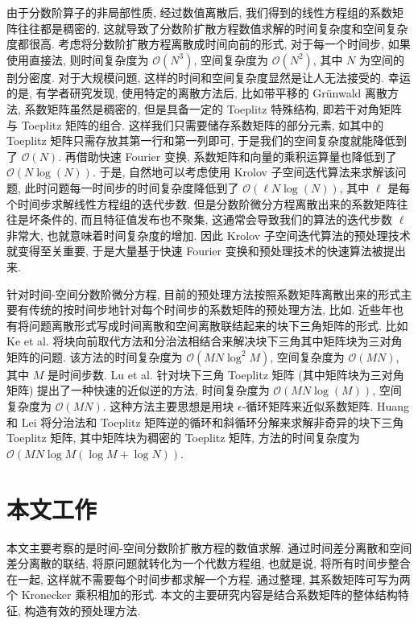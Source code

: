 \documentclass{ecnumaster}
\begin{document}
由于分数阶算子的非局部性质, 经过数值离散后, 我们得到的线性方程组的系数矩阵往往都是稠密的,
这就导致了分数阶扩散方程数值求解的时间复杂度和空间复杂度都很高.
考虑将分数阶扩散方程离散成时间向前的形式, 对于每一个时间步, 如果使用直接法,
则时间复杂度为 $\mathcal{O}(N^3)$, 空间复杂度为 $\mathcal{O}(N^2)$,
其中 $N$ 为空间的剖分密度.
对于大规模问题, 这样的时间和空间复杂度显然是让人无法接受的.
幸运的是, 有学者研究发现, 使用特定的离散方法后, 比如带平移的 Gr\"unwald 离散方法\cite{WW11},
系数矩阵虽然是稠密的, 但是具备一定的 Toeplitz 特殊结构\cite{WWS10},
即若干对角矩阵与 Toeplitz 矩阵的组合.
这样我们只需要储存系数矩阵的部分元素, 如其中的 Toeplitz 矩阵只需存放其第一行和第一列即可,
于是我们的空间复杂度就能降低到了 $\mathcal{O}(N)$.
再借助快速 Fourier 变换, 系数矩阵和向量的乘积运算量也降低到了 $\mathcal{O}(N\log (N))$.
于是, 自然地可以考虑使用 Krolov 子空间迭代算法来求解该问题,
此时问题每一时间步的时间复杂度降低到了 $\mathcal{O}(\ell N\log (N))$,
其中 $\ell$ 是每个时间步求解线性方程组的迭代步数.
但是分数阶微分方程离散出来的系数矩阵往往是坏条件的,
而且特征值发布也不聚集, 这通常会导致我们的算法的迭代步数 $\ell$ 非常大,
也就意味着时间复杂度的增加.
因此 Krolov 子空间迭代算法的预处理技术就变得至关重要,
于是大量基于快速 Fourier 变换和预处理技术的快速算法被提出来\cite{BLP17, DMS16, JLZ15, LS13, LYJ14, PKNS14, PS12, SYM15, WWS10, WD13, WW11}.

针对时间-空间分数阶微分方程,
目前的预处理方法按照系数矩阵离散出来的形式主要有传统的按时间步地针对每个时间步的系数矩阵的预处理方法,
比如\cite{GHJCA17, LGHFZ18, LS13, PS12, GHLLL14, GHZLL15, WWS10, ZZL18}.
%
近些年也有将问题离散形式写成时间离散和空间离散联结起来的块下三角矩阵的形式.
比如 Ke et al.\cite{KNS15} 将块向前取代方法和分治法相结合来解决块下三角其中矩阵块为三对角矩阵的问题.
该方法的时间复杂度为 $\mathcal{O}(MN\log^2M)$, 空间复杂度为 $\mathcal{O}(MN)$, 其中 $M$ 是时间步数.
Lu et al.\cite{LPS15} 针对块下三角 Toeplitz 矩阵
(其中矩阵块为三对角矩阵) 提出了一种快速的近似逆的方法,
时间复杂度为 $\mathcal{O}(MN\log(M))$, 空间复杂度为 $\mathcal{O}(MN)$.
这种方法主要思想是用块 $\epsilon$-循环矩阵来近似系数矩阵.
Huang 和 Lei \cite{HL17} 将分治法和 Toeplitz 矩阵逆的循环和斜循环分解来求解非奇异的块下三角 Toeplitz 矩阵,
其中矩阵块为稠密的 Toeplitz 矩阵, 方法的时间复杂度为 $\mathcal{O}(MN\log M(\log M + \log N))$.



\section{本文工作}
本文主要考察的是时间-空间分数阶扩散方程的数值求解.
通过时间差分离散和空间差分离散的联结, 将原问题就转化为一个代数方程组,
也就是说, 将所有时间步整合在一起, 这样就不需要每个时间步都求解一个方程.
%
通过整理, 其系数矩阵可写为两个 Kronecker 乘积相加的形式.
本文的主要研究内容是结合系数矩阵的整体结构特征, 构造有效的预处理方法.
\end{document}
